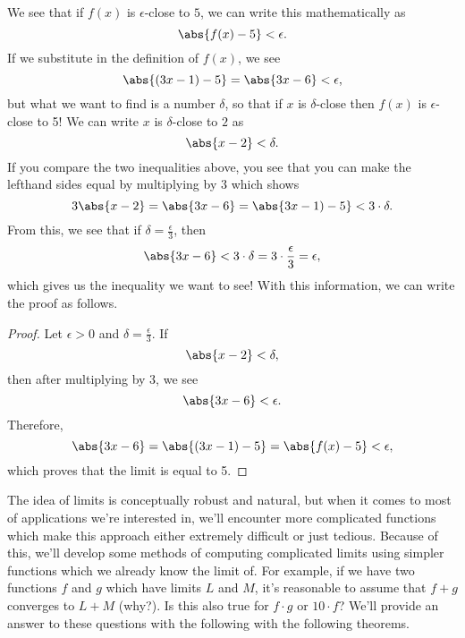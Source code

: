 \begin{exmp}
We see that if $f(x)$ is $\epsilon$-close to $5$, we can write this mathematically as
\[
\abs{f(x)-5}<\epsilon.
\]
If we substitute in the definition of $f(x)$, we see
\[
\abs{(3x-1)-5}=\abs{3x-6}<\epsilon,
\]
but what we want to find is a number $\delta$, so that if $x$ is $\delta$-close then $f(x)$ is $\epsilon$-close to 5! We can write $x$ is $\delta$-close to $2$ as
\[
\abs{x-2}<\delta.
\]
If you compare the two inequalities above, you see that you can make the lefthand sides equal by multiplying by $3$ which shows
\[
3\abs{x-2}= \abs{3x-6}=\abs{3x-1)-5} <3\cdot\delta.
\]
From this, we see that if $\delta=\frac{\epsilon}{3}$, then
\[
\abs{3x-6}<3\cdot\delta=3\cdot\frac{\epsilon}{3}=\epsilon,
\]
which gives us the inequality we want to see! With this information, we can write the proof as follows.
\begin{proof}
  Let $\epsilon>0$ and $\delta=\frac{\epsilon}{3}$. If
  \[
\abs{x-2} < \delta,
  \]
  then after multiplying by 3, we see
  \[
\abs{3x-6} < \epsilon.
  \]
  Therefore,
  \[
    \abs{3x-6}=\abs{(3x-1)-5} =\abs{f(x)-5 }<\epsilon,
    \]
which proves that the limit is equal to 5.
\end{proof}
\end{exmp}








The idea of limits is conceptually robust and natural, but when it comes to most of applications we're interested in, we'll encounter more complicated functions which make this approach either extremely difficult or just tedious. Because of this,  we'll develop some methods of computing complicated limits using simpler functions which we already know the limit of. For example, if we have two functions $f$ and $g$ which have limits $L$ and $M$, it's reasonable to assume that $f+g$ converges to $L+M$ (why?). Is this also true for $f\cdot g$ or $10\cdot f$? We'll provide an answer to these questions with the following with the following theorems.

